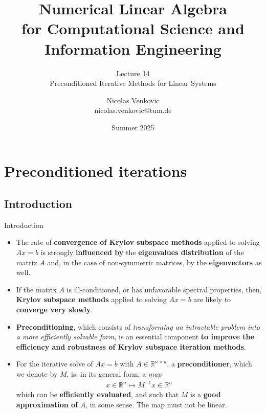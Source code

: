 \documentclass[t,usepdftitle=false]{beamer}
\title[NLA for CS and IE -- Lecture 14]{Numerical Linear Algebra\\for Computational Science and Information Engineering}
\subtitle{\vspace{.3cm}Lecture 14\\Preconditioned Iterative Methods for Linear Systems}
\date[Summer 2025]{Summer 2025}
\author[nicolas.venkovic@tum.de]{Nicolas Venkovic\\{\small nicolas.venkovic@tum.de}}
\institute[]{Group of Computational Mathematics\\School of Computation, Information and Technology\\Technical University of Munich}
\begin{document}
	
\begin{frame}
	\maketitle
\end{frame}
	
\myoutlineframe
	
\section{Preconditioned iterations}

\subsection{Introduction}
\begin{frame}{Introduction}
\begin{itemize}
\item The rate of \textbf{convergence of Krylov subspace methods} applied to solving $Ax=b$ is strongly \textbf{influenced by} the \textbf{eigenvalues distribution} of the matrix $A$ and, in the case of non-symmetric matrices, by the \textbf{eigenvectors} as well.
\item[]If the matrix $A$ is ill-conditioned, or has unfavorable spectral properties, then, \textbf{Krylov subspace methods} applied to solving $Ax=b$ are likely to \textbf{converge very slowly}.
\item \textbf{Preconditioning}, which consists of \textit{transforming an intractable problem into a more efficiently solvable form}, is an essential component \textbf{to improve the efficiency and robustness of Krylov subspace iteration methods}.
\item[] For the iterative solve of $Ax=b$ with $A\in\mathbb{R}^{n\times n}$, a \textbf{preconditioner}, which we denote by $M$, is, in its general form, a \textit{map}
\begin{align*}
x\in\mathbb{R}^n\mapsto M^{-1}x\in\mathbb{R}^n
\end{align*}
which can be \textbf{efficiently evaluated}, and such that $M$ is a \textbf{good approximation of} $A$, in some sense.
The map must not be linear.
\end{itemize}
\end{frame}
\end{document}
